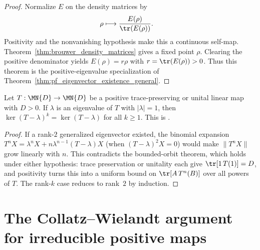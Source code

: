 \begin{proof}\leanok
    Normalize $E$ on the density matrices by
    \begin{align}
        \rho
         & \longmapsto\frac{E(\rho)}{\tr(E(\rho))}.
        \notag
    \end{align}
    Positivity and the nonvanishing hypothesis make this a continuous
    self-map. Theorem~\ref{thm:brouwer_density_matrices} gives a fixed point
    $\rho$. Clearing the positive denominator yields
    $E(\rho)=r\rho$ with $r=\tr(E(\rho))>0$. Thus this theorem is the
    positive-eigenvalue specialization of
    Theorem~\ref{thm:pf_eigenvector_existence_general}.
\end{proof}

\begin{theorem}
    \label{thm:peripheral_jordan_trivial}
    \leanok
    Let $T:\MN{D}\to\MN{D}$ be a positive trace-preserving or unital
    linear map with $D>0$.  If $\lambda$ is an eigenvalue of $T$ with
    $|\lambda|=1$, then $\ker(T-\lambda)^k=\ker(T-\lambda)$ for all
    $k\ge1$.  This is \cite[Proposition~6.2]{Wolf2012Quantum}.
\end{theorem}

\begin{proof}\leanok
    If a rank-$2$ generalized eigenvector existed, the binomial expansion
    $T^n X=\lambda^n X+n\lambda^{n-1}(T-\lambda)X$ (when
    $(T-\lambda)^2X=0$) would make $\|T^nX\|$ grow linearly with $n$.  This
    contradicts the bounded-orbit theorem, which holds under either
    hypothesis: trace preservation or unitality each give
    $\tr[1\,T(1)]=D$, and positivity turns this into a uniform bound on
    $\tr[A\,T^n(B)]$ over all powers of $T$.  The rank-$k$ case reduces to
    rank~$2$ by induction.
\end{proof}

\section{The Collatz--Wielandt argument for irreducible positive maps}

